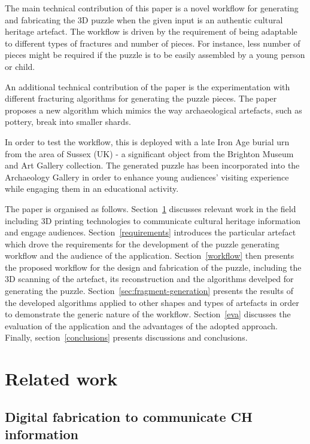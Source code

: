 \documentclass[acmlarge,screen,dvipsnames]{acmart}
\begin{document}
The main technical contribution of this paper is a novel workflow for
generating and fabricating the 3D puzzle when the given input is an
authentic cultural heritage artefact. The workflow is driven by the
requirement of being adaptable to different types of fractures and
number of pieces. For instance, less number of pieces might be
required if the puzzle is to be easily assembled by a young person or
child.

An additional technical contribution of the paper is the
experimentation with different fracturing algorithms for generating
the puzzle pieces. The paper proposes a new algorithm which mimics the
way archaeological artefacts, such as pottery, break into smaller
shards.

In order to test the workflow, this is deployed with a late Iron Age
burial urn from the area of Sussex (UK) - a significant object from
the Brighton Museum and Art Gallery collection. The generated puzzle
has been incorporated into the Archaeology Gallery in order to enhance
young audiences' visiting experience while engaging them in an
educational activity.


The paper is organised as follows. Section~\ref{related} discusses
relevant work in the field including 3D printing technologies to
communicate cultural heritage information and engage
audiences. Section~\ref{requirements} introduces the particular
artefact which drove the requirements for the development of the
puzzle generating workflow and the audience of the
application. Section~\ref{workflow} then presents the proposed
workflow for the design and fabrication of the puzzle, including the
3D scanning of the artefact, its reconstruction and the algorithms
develped for generating the
puzzle. Section~\ref{sec:fragment-generation} presents the results of
the developed algorithms applied to other shapes and types of
artefacts in order to demonstrate the generic nature of the
workflow. Section~\ref{eva} discusses the evaluation of the
application and the advantages of the adopted approach. Finally,
section~\ref{conclusions} presents discussions and conclusions.

\section{Related work}
\label{related}

\subsection{Digital fabrication to communicate CH information}
\end{document}
